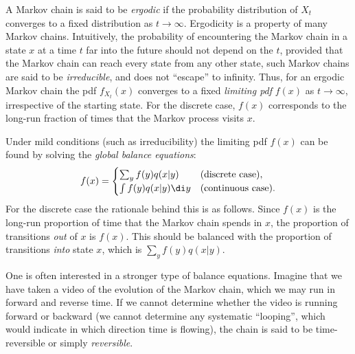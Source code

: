 A Markov chain is said to be \textit{ergodic} if the probability distribution of \(X_t\) converges to a fixed distribution as \(t \to \infty\). Ergodicity is a property of many Markov chains. Intuitively, the probability of encountering the Markov chain in a state \(x\) at a time \(t\) far into the future should not depend on the \(t\), provided that the Markov chain can reach every state from any other state, such Markov chains are said to be \textit{irreducible}, and does not ``escape'' to infinity. Thus, for an ergodic Markov chain the pdf \(f_{X_t}(x)\) converges to a fixed \textit{limiting pdf} \(f(x)\) as \(t \to \infty\), irrespective of the starting state. For the discrete case, \(f(x)\) corresponds to the long-run fraction of times that the Markov process visits \(x\).

Under mild conditions (such as irreducibility) the limiting pdf \(f(x)\) can be found by solving the \textit{global balance equations}:
\begin{equation} \label{eq:GlobalBalance}
	f(x) = \begin{cases} \sum_y f(y)q(x|y) & (\text{discrete case}), \\ \int f(y)q(x|y) \di y & (\text{continuous case}). \end{cases}
\end{equation}
For the discrete case the rationale behind this is as follows. Since \(f(x)\) is the long-run proportion of time that the Markov chain spends in \(x\), the proportion of transitions \textit{out} of \(x\) is \(f(x)\). This should be balanced with the proportion of transitions \textit{into} state \(x\), which is \(\sum_y f(y)q(x|y)\).

One is often interested in a stronger type of balance equations. Imagine that we have taken a video of the evolution of the Markov chain, which we may run in forward and reverse time. If we cannot determine whether the video is running forward or backward (we cannot determine any systematic ``looping'', which would indicate in which direction time is flowing), the chain is said to be time-reversible or simply \textit{reversible}.

